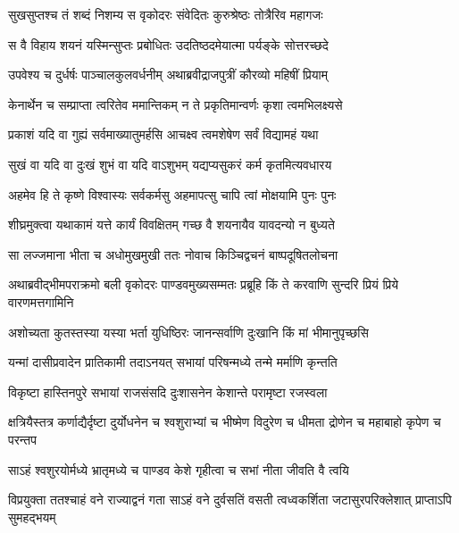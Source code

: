 
\twolineshloka
{सुखसुप्तश्च तं शब्दं निशम्य स वृकोदरः}
{संवेदितः कुरुश्रेष्ठः तोत्रैरिव महागजः}


\twolineshloka
{स वै विहाय शयनं यस्मिन्सुप्तः प्रबोधितः}
{उदतिष्ठदमेयात्मा पर्यङ्के सोत्तरच्छदे}


\twolineshloka
{उपवेश्य च दुर्धर्षः पाञ्चालकुलवर्धनीम्}
{अथाब्रवीद्राजपुत्रीं कौरव्यो महिषीं प्रियाम्}


\twolineshloka
{केनार्थेन च सम्प्राप्ता त्वरितेव ममान्तिकम्}
{न ते प्रकृतिमान्वर्णः कृशा त्वमभिलक्ष्यसे}


\twolineshloka
{प्रकाशं यदि वा गुह्यं सर्वमाख्यातुमर्हसि}
{आचक्ष्व त्वमशेषेण सर्वं विद्यामहं यथा}


\twolineshloka
{सुखं वा यदि वा दुःखं शुभं वा यदि वाऽशुभम्}
{यद्यप्यसुकरं कर्म कृतमित्यवधारय}


\twolineshloka
{अहमेव हि ते कृष्णे विश्वास्यः सर्वकर्मसु}
{अहमापत्सु चापि त्वां मोक्षयामि पुनः पुनः}


\twolineshloka
{शीघ्रमुक्त्वा यथाकामं यत्ते कार्यं विवक्षितम्}
{गच्छ वै शयनायैव यावदन्यो न बुध्यते}



\twolineshloka
{सा लज्जमाना भीता च अधोमुखमुखी ततः}
{नोवाच किञ्चिद्वचनं बाष्पदूषितलोचना}


\fourlineindentedshloka
{अथाब्रवीद्भीमपराक्रमो बली}
{वृकोदरः पाण्डवमुख्यसम्मतः}
{प्रब्रूहि किं ते करवाणि सुन्दरि}
{प्रियं प्रिये वारणमत्तगामिनि}




\twolineshloka
{अशोच्यता कुतस्तस्या यस्या भर्ता युधिष्ठिरः}
{जानन्सर्वाणि दुःखानि किं मां भीमानुपृच्छसि}


\twolineshloka
{यन्मां दासीप्रवादेन प्रातिकामी तदाऽनयत्}
{सभायां परिषन्मध्ये तन्मे मर्माणि कृन्तति}


\twolineshloka
{विकृष्टा हास्तिनपुरे सभायां राजसंसदि}
{दुःशासनेन केशान्ते परामृष्टा रजस्वला}


\threelineshloka
{क्षत्रियैस्तत्र कर्णाद्यैर्दृष्टा दुर्योधनेन च}
{श्वशुराभ्यां च भीष्मेण विदुरेण च धीमता}
{द्रोणेन च महाबाहो कृपेण च परन्तप}


\twolineshloka
{साऽहं श्वशुरयोर्मध्ये भ्रातृमध्ये च पाण्डव}
{केशे गृहीत्वा च सभां नीता जीवति वै त्वयि}


\threelineshloka
{विप्रयुक्ता ततश्चाहं वने राज्याद्वनं गता}
{साऽहं वने दुर्वसतिं वसती त्वध्वकर्शिता}
{जटासुरपरिक्लेशात् प्राप्ताऽपि सुमहद्भयम्}


